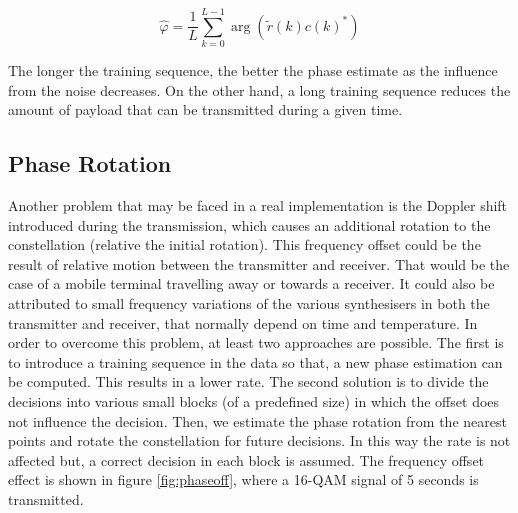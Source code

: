 \documentclass[12pt,a4paper,openright]{report}
\begin{document}
\begin{equation}
\hat \varphi  = \frac{1}{L}\sum\limits_{k=0}^{L - 1} {\arg (\tilde r(k)c(k)^*)}
\end{equation}

The longer the training sequence, the better the phase estimate as the influence from the noise decreases. On the other hand, a long training sequence reduces the amount of payload that can be transmitted during a given time.

\subsection{Phase Rotation}
\label{subsec:Phase rotation}
Another problem that may be faced in a real implementation is the Doppler shift introduced during the transmission, which causes an additional rotation to the constellation (relative the initial rotation). This frequency offset could be the result of relative motion between the transmitter and receiver. That would be the case of a mobile terminal travelling away or towards a receiver. It could also be attributed to small frequency variations of the various synthesisers in both the transmitter and receiver, that normally depend on time and temperature. In order to overcome this problem, at least two approaches are possible. The first is to introduce a training sequence in the data so that, a new phase estimation can be computed. This results in a lower rate. The second solution is to divide the decisions into various small blocks (of a predefined size) in which the offset does not influence the decision. Then, we estimate the phase rotation from the nearest points and rotate the constellation for future decisions. In this way the rate is not affected but, a correct decision in each block is assumed. The frequency offset effect is shown in  figure \ref{fig:phaseoff}, where a 16-QAM signal of 5 seconds is transmitted. 
\end{document}
